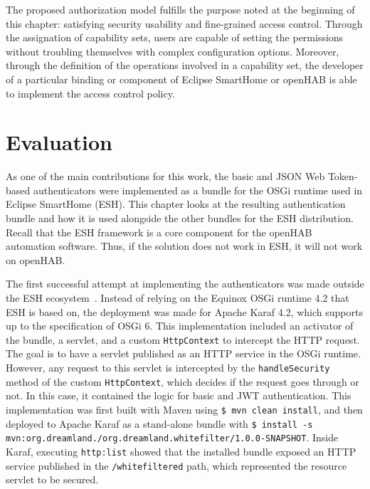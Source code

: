 \documentclass[12pt]{article}
\newcommand{\TODO}{\todo[inline]}
\begin{document}
The proposed authorization model fulfills the purpose noted at the beginning of this chapter: satisfying security usability and fine-grained access control. Through the assignation of capability sets, users are capable of setting the permissions without troubling themselves with complex configuration options. Moreover, through the definition of the operations involved in a capability set, the developer of a particular binding or component of Eclipse SmartHome or openHAB is able to implement the access control policy.

\newpage
\section{Evaluation}
\label{sec:eval}
\TODO{SUMMARY}

As one of the main contributions for this work, the basic and JSON Web Token-based authenticators were implemented as a bundle for the OSGi runtime used in Eclipse SmartHome (ESH). This chapter looks at the resulting authentication bundle and how it is used alongside the other bundles for the ESH distribution. Recall that the ESH framework is a core component for the openHAB automation software. Thus, if the solution does not work in ESH, it will not work on openHAB.

The first successful attempt at implementing the authenticators was made outside the ESH ecosystem~\cite{repo_02}. Instead of relying on the Equinox OSGi runtime 4.2 that ESH is based on, the deployment was made for Apache Karaf 4.2, which supports up to the specification of OSGi 6. This implementation included an activator of the bundle, a servlet, and a custom \texttt{HttpContext} to intercept the HTTP request. The goal is to have a servlet published as an HTTP service in the OSGi runtime. However, any request to this servlet is intercepted by the \texttt{handleSecurity} method of the custom \texttt{HttpContext}, which decides if the request goes through or not. In this case, it contained the logic for basic and JWT authentication. This implementation was first built with Maven using \texttt{\$ mvn clean install}, and then deployed to Apache Karaf as a stand-alone bundle with \texttt{\$ install -s mvn:org.dreamland./org.dreamland.whitefilter/1.0.0-SNAPSHOT}. Inside Karaf, executing \texttt{http:list} showed that the installed bundle exposed an HTTP service published in the \texttt{/whitefiltered} path, which represented the resource servlet to be secured.
\end{document}
